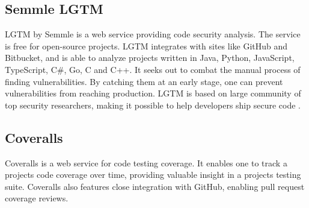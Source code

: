 \subsection{Semmle LGTM}
\label{sec:theory-semmle-lgtm}
LGTM by Semmle \cite{lgtm} is a web service providing code security analysis. The service is free for open-source projects. LGTM integrates with sites like GitHub and Bitbucket, and is able to analyze projects written in Java, Python, JavaScript, TypeScript, C\#, Go, C and C++. It seeks out to combat the manual process of finding vulnerabilities. By catching them at an early stage, one can prevent vulnerabilities from reaching production. LGTM is based on large community of top security researchers, making it possible to help developers ship secure code \cite{lgtm-security}.

\subsection{Coveralls}
\label{sec:theory-coveralls}
Coveralls \cite{coveralls} is a web service for code testing coverage. It enables one to track a projects code coverage over time, providing valuable insight in a projects testing suite. Coveralls also features close integration with GitHub, enabling pull request coverage reviews.

